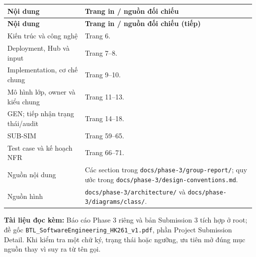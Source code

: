 \documentclass[12pt,a4paper]{article}
\newenvironment{PairTable}[2]{%
  \begin{longtable}{|L{39mm}|L{106mm}|}\hline
  \textbf{#1} & \textbf{#2}\\\hline\endfirsthead
  \hline\textbf{#1} & \textbf{#2 (tiếp)}\\\hline\endhead
}{\end{longtable}}
\begin{document}
\begin{PairTable}{Nội dung}{Trang in / nguồn đối chiếu}
Kiến trúc và công nghệ & Trang 6.\\\hline
Deployment, Hub và input & Trang 7--8.\\\hline
Implementation, cơ chế chung & Trang 9--10.\\\hline
Mô hình lớp, owner và kiểu chung & Trang 11--13.\\\hline
GEN; tiếp nhận trạng thái/audit & Trang 14--18.\\\hline
SUB-SIM & Trang 59--65.\\\hline
Test case và kế hoạch NFR & Trang 66--71.\\\hline
Nguồn nội dung & Các section trong \texttt{docs/phase-3/group-report/}; quy ước trong \texttt{docs/phase-3/design-conventions.md}.\\\hline
Nguồn hình & \texttt{docs/phase-3/architecture/} và \texttt{docs/phase-3/diagrams/class/}.\\\hline
\end{PairTable}

\noindent\textbf{Tài liệu đọc kèm:} Báo cáo Phase 3 riêng và bản Submission 3 tích hợp ở root; đề gốc \texttt{BTL\_SoftwareEngineering\_HK261\_v1.pdf}, phần Project Submission Detail. Khi kiểm tra một chữ ký, trạng thái hoặc ngưỡng, ưu tiên mở đúng mục nguồn thay vì suy ra từ tên gọi.
\end{document}
